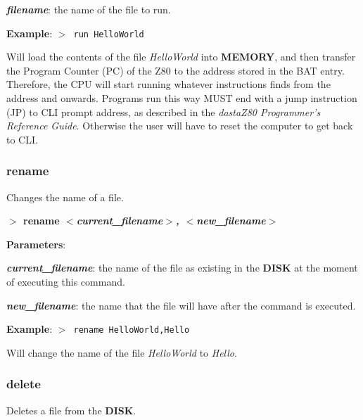 \documentclass[a4paper,11pt]{article}
\begin{document}
        \hspace{1cm}\textbf{\textit{filename}}: the name of the file to run.
        
        \textbf{Example}: \texttt{$>$ run HelloWorld}

        Will load the contents of the file \textit{HelloWorld} into
        \textbf{MEMORY}, and then transfer the Program Counter (PC) of the Z80
        to the address stored in the BAT entry. Therefore, the CPU will start
        running whatever instructions finds from the address and onwards.
        Programs run this way MUST end with a jump instruction (JP) to CLI
        prompt address, as described in the \textit{dastaZ80 Programmer’s
        Reference Guide}\cite{dastaz80progref}. Otherwise the user will have to
        reset the computer to get back to CLI.

        \subsubsection{{\color{blue}rename}}
        Changes the name of a file.

        \hspace{1.9cm}\textbf{$>$ rename \textit{$<$current\_filename$>$,
        $<$new\_filename$>$}}

        \textbf{Parameters}:

        \hspace{1cm}\textbf{\textit{current\_filename}}: the name of the file as
        existing in the \textbf{DISK} at the moment of executing this command.
        
        \hspace{1cm}\textbf{\textit{new\_filename}}: the name that the file will
        have after the command is executed.

        \textbf{Example}: \texttt{$>$ rename HelloWorld,Hello}

        Will change the name of the file \textit{HelloWorld} to \textit{Hello}.

        \subsubsection{{\color{blue}delete}}
        Deletes a file from the \textbf{DISK}.
\end{document}
